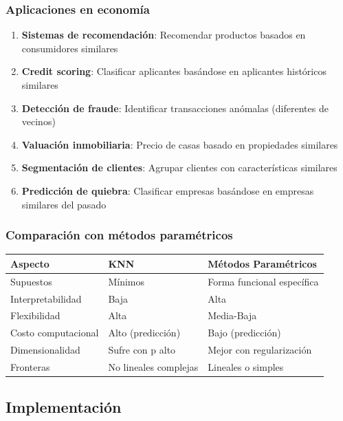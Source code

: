 \documentclass[
  doc,
  floatsintext,
  longtable,
  a4paper,
  nolmodern,
  notxfonts,
  notimes,
  12pt,
  colorlinks=true,linkcolor=blue,citecolor=blue,urlcolor=blue]{apa7}
\newcounter{none} %
\begin{document}
\subsubsection{Aplicaciones en
economía}\label{aplicaciones-en-economuxeda}

\begin{enumerate}
\def\labelenumi{\arabic{enumi}.}
\item
  \textbf{Sistemas de recomendación}: Recomendar productos basados en
  consumidores similares
\item
  \textbf{Credit scoring}: Clasificar aplicantes basándose en aplicantes
  históricos similares
\item
  \textbf{Detección de fraude}: Identificar transacciones anómalas
  (diferentes de vecinos)
\item
  \textbf{Valuación inmobiliaria}: Precio de casas basado en propiedades
  similares
\item
  \textbf{Segmentación de clientes}: Agrupar clientes con
  características similares
\item
  \textbf{Predicción de quiebra}: Clasificar empresas basándose en
  empresas similares del pasado
\end{enumerate}

\subsubsection{Comparación con métodos
paramétricos}\label{comparaciuxf3n-con-muxe9todos-paramuxe9tricos}

{\def\LTcaptype{none} %
\begin{longtable}[]{@{}lll@{}}
\toprule\noalign{}
Aspecto & KNN & Métodos Paramétricos \\
\midrule\noalign{}
\endhead
\bottomrule\noalign{}
\endlastfoot
Supuestos & Mínimos & Forma funcional específica \\
Interpretabilidad & Baja & Alta \\
Flexibilidad & Alta & Media-Baja \\
Costo computacional & Alto (predicción) & Bajo (predicción) \\
Dimensionalidad & Sufre con p alto & Mejor con regularización \\
Fronteras & No lineales complejas & Lineales o simples \\
\end{longtable}
}

\subsection{Implementación}\label{implementaciuxf3n-1}
\end{document}
